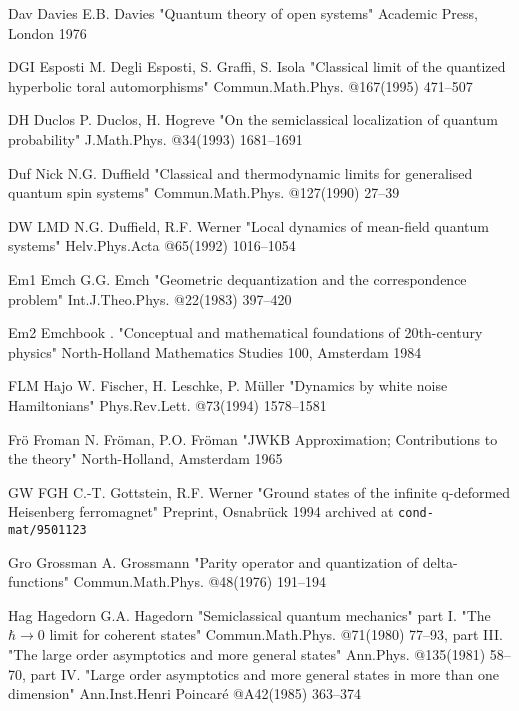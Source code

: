 \REF Dav Davies \Bref
     E.B. Davies
     "Quantum theory of open systems"
     Academic Press, London 1976

\REF DGI Esposti \Jref
    M. Degli Esposti, S. Graffi, S. Isola
    "Classical limit of the quantized hyperbolic toral
    automorphisms"
    Commun.Math.Phys. @167(1995) 471--507

\REF DH Duclos \Jref
    P. Duclos, H. Hogreve
    "On the semiclassical localization of quantum probability"
    J.Math.Phys. @34(1993) 1681--1691

\REF Duf Nick \Gref
    N.G. Duffield
    "Classical and thermodynamic limits for generalised quantum spin
    systems"
    Commun.Math.Phys. @127(1990) 27--39

\REF DW LMD   \Jref
    N.G. Duffield,  R.F. Werner
    "Local dynamics of mean-field quantum systems"
    Helv.Phys.Acta @65(1992) 1016--1054

\REF Em1 Emch \Jref
     G.G. Emch
    "Geometric dequantization and the correspondence problem"
     Int.J.Theo.Phys. @22(1983) 397--420

\REF Em2 Emchbook \Bref
    \sameauthor. {}
    "Conceptual and mathematical foundations of 20th-century
    physics"
    North-Holland Mathematics Studies 100,
    Amsterdam 1984

\REF FLM Hajo \Jref
    W. Fischer, H. Leschke, P. M\"uller
    "Dynamics by white noise Hamiltonians"
    Phys.Rev.Lett. @73(1994) 1578--1581

\REF Fr\"o  Froman \Bref
    N. Fr\"oman, P.O. Fr\"oman
    "JWKB Approximation; Contributions to the theory"
    North-Holland, Amsterdam 1965

\REF GW FGH \Gref
    C.-T. Gottstein, R.F. Werner
    "Ground states of the infinite q-deformed Heisenberg
    ferromagnet"
    Preprint, Osnabr\"uck 1994
    archived at {\tt cond-mat/9501123}

\REF Gro Grossman \Jref
   A. Grossmann
   "Parity operator and quantization of delta-functions"
   Commun.Math.Phys. @48(1976) 191--194

\REF Hag Hagedorn \Gref
    G.A. Hagedorn
    "Semiclassical quantum mechanics"
    \more    \Jref part I\eat. {}
    "The $\hbar\to0$ limit for coherent states"
    Commun.Math.Phys. @71(1980) 77--93,
    \more    \Jref part III\eat. {}
    "The large order asymptotics and more general states"
    Ann.Phys. @135(1981) 58--70,
    \more    \Jref part IV\eat. {}
    "Large order asymptotics and more general states in
    more than one dimension"
    \hfill\break
    Ann.Inst.Henri Poincar\'e @A42(1985) 363--374


